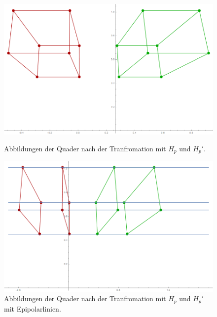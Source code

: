 
\begin{figure}[!htb]
	\includegraphics[width=\linewidth]{images/Rectification_Hp_same_Solutions.png}
	\caption[Projektive Transformationen $H_p$ und $H_p'$]{Abbildungen der Quader nach der Tranfromation mit $H_p$ und $H_p'$.}
	\label{fig:RectSameHp1}
	\endminipage\hfill
	\includegraphics[width=\linewidth]{images/Rectification_Hp_same_Solutions_Lines.png}
	\caption[Projektive Transformationen $H_p$ und $H_p'$ mit Epipolarlinien]{Abbildungen der Quader nach der Tranfromation mit $H_p$ und $H_p'$ mit Epipolarlinien.}
	\label{fig:RectSameHp2}
	\endminipage\hfill
\end{figure}

